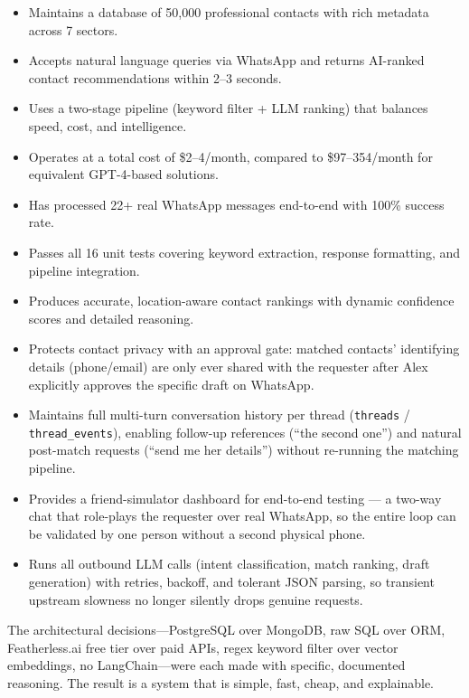 \documentclass[12pt, a4paper]{report}
\begin{document}
\begin{itemize}[itemsep=3pt]
    \item Maintains a database of 50,000 professional contacts with rich metadata across 7 sectors.
    \item Accepts natural language queries via WhatsApp and returns AI-ranked contact recommendations within 2--3 seconds.
    \item Uses a two-stage pipeline (keyword filter + LLM ranking) that balances speed, cost, and intelligence.
    \item Operates at a total cost of \$2--4/month, compared to \$97--354/month for equivalent GPT-4-based solutions.
    \item Has processed 22+ real WhatsApp messages end-to-end with 100\% success rate.
    \item Passes all 16 unit tests covering keyword extraction, response formatting, and pipeline integration.
    \item Produces accurate, location-aware contact rankings with dynamic confidence scores and detailed reasoning.
    \item Protects contact privacy with an approval gate: matched contacts' identifying details (phone/email) are only ever shared with the requester after Alex explicitly approves the specific draft on WhatsApp.
    \item Maintains full multi-turn conversation history per thread (\texttt{threads} / \texttt{thread\_events}), enabling follow-up references (``the second one'') and natural post-match requests (``send me her details'') without re-running the matching pipeline.
    \item Provides a friend-simulator dashboard for end-to-end testing --- a two-way chat that role-plays the requester over real WhatsApp, so the entire loop can be validated by one person without a second physical phone.
    \item Runs all outbound LLM calls (intent classification, match ranking, draft generation) with retries, backoff, and tolerant JSON parsing, so transient upstream slowness no longer silently drops genuine requests.
\end{itemize}

The architectural decisions---PostgreSQL over MongoDB, raw SQL over ORM, Featherless.ai free tier over paid APIs, regex keyword filter over vector embeddings, no LangChain---were each made with specific, documented reasoning. The result is a system that is simple, fast, cheap, and explainable.
\end{document}
